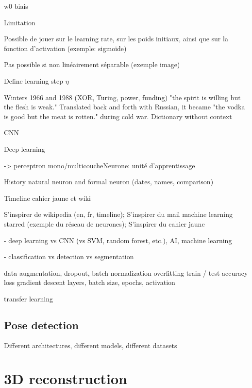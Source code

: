 w0 biais

Limitation


Possible de jouer sur le learning rate, sur les poids initiaux, ainsi que sur la fonction d'activation (exemple: sigmoïde)

Pas possible si non linéairement séparable (exemple image)

Define learning step $\eta$ 

Winters 1966 and 1988 (XOR, Turing, power, funding)
"the spirit is willing but the flesh is weak." Translated back and forth with Russian, it became "the vodka is good but the meat is rotten." during cold war. Dictionary without context

CNN

Deep learning

-> perceptron mono/multicoucheNeurone: unité d'apprentissage



History natural neuron and formal neuron (dates, names, comparison)

Timeline cahier jaune et wiki

S'inspirer de wikipedia (en, fr, timeline); 
S'inspirer du mail machine learning starred (exemple du réseau de neurones); 
S'inspirer du cahier jaune


- deep learning vs CNN (vs SVM, random forest, etc.), AI, machine learning

- classification vs detection vs segmentation

data augmentation, dropout, batch normalization
overfitting
train / test
accuracy loss
gradient descent
layers, batch size, epochs, activation

transfer learning



\subsection{Pose detection}

Different architectures, different models, different datasets


\section{3D reconstruction}\label{sec:3D reconstruction}

